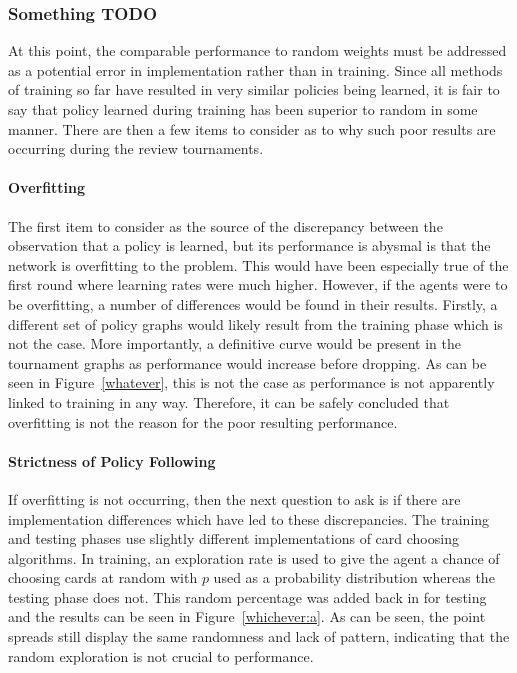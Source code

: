 
\subsubsection{Something TODO}
\label{sec:findings-r2-length}

At this point,
the comparable performance to random weights must be addressed as a potential
error in implementation rather than in training.
%
Since all methods of training so far have resulted in very similar policies
being learned,
it is fair to say that policy learned during training has been superior to
random in some manner.
%
There are then a few items to consider as to why such poor results are occurring
during the review tournaments.


\paragraph{Overfitting}

The first item to consider as the source of the discrepancy between the
observation that a policy is learned,
but its performance is abysmal
is that the network is overfitting to the problem.
%
This would have been especially true of the first round where learning rates
were much higher.
%
However,
if the agents were to be overfitting,
a number of differences would be found in their results.
%
Firstly,
a different set of policy graphs would likely result from the training phase
which is not the case. %
%
More importantly,
a definitive curve would be present in the tournament graphs as performance
would increase before dropping.
%
As can be seen in Figure~\ref{whatever},
this is not the case
as performance is not apparently linked to training in any way.
%
Therefore, it can be safely concluded that overfitting is not the reason
for the poor resulting performance.

\paragraph{Strictness of Policy Following}

If overfitting is not occurring,
then the next question to ask is if there are implementation differences which
have led to these discrepancies.
%
The training and testing phases use slightly different implementations of 
card choosing algorithms.
%
In training,
an exploration rate is used to give the agent a chance of choosing cards at
random with $p$ used as a probability distribution
whereas the testing phase does not.
%
This random percentage was added back in for testing and the results can be seen
in Figure~\ref{whichever:a}.
%
As can be seen,
the point spreads still display the same randomness and lack of pattern,
indicating that the random exploration is not crucial to performance.

